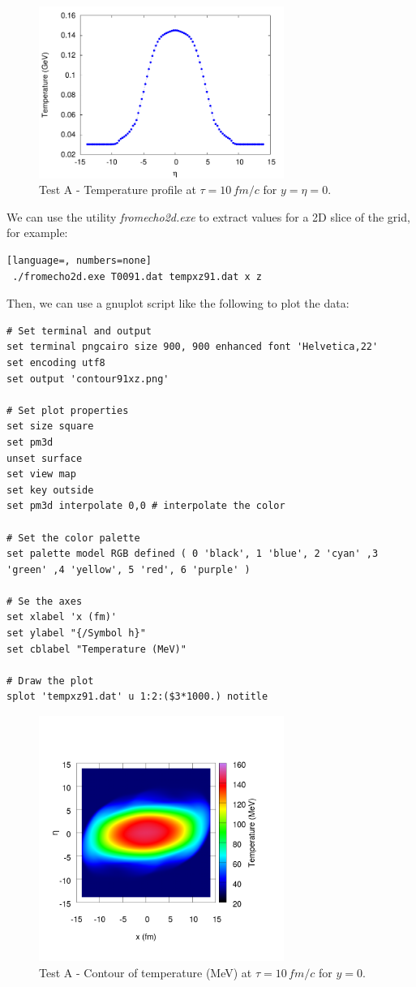 \begin{figure}[!h]
 \begin{center}
  \includegraphics[width=8cm]{images/temperature.pdf}
   \caption{Test A - Temperature profile at $\tau=10\,fm/c$ for $y=\eta=0$.}
    \label{plot4}
 \end{center}
\end{figure}
We can use the utility \emph{fromecho2d.exe} to extract values for a 2D slice of the grid, for example:
\begin{lstlisting}[language=, numbers=none] 
 ./fromecho2d.exe T0091.dat tempxz91.dat x z
\end{lstlisting}
Then, we can use a gnuplot script like the following to plot the data:
\begin{lstlisting}[numbers=none, language=Gnuplot]
# Set terminal and output
set terminal pngcairo size 900, 900 enhanced font 'Helvetica,22'
set encoding utf8
set output 'contour91xz.png'

# Set plot properties
set size square
set pm3d
unset surface 
set view map
set key outside
set pm3d interpolate 0,0 # interpolate the color

# Set the color palette
set palette model RGB defined ( 0 'black', 1 'blue', 2 'cyan' ,3 'green' ,4 'yellow', 5 'red', 6 'purple' )

# Se the axes
set xlabel 'x (fm)'
set ylabel "{/Symbol h}"
set cblabel "Temperature (MeV)"

# Draw the plot
splot 'tempxz91.dat' u 1:2:($3*1000.) notitle
\end{lstlisting}
\begin{figure}[!h]
 \begin{center}
  \includegraphics[width=8cm]{images/contour91xz.png}
   \caption{Test A - Contour of temperature (MeV) at $\tau=10\,fm/c$ for $y=0$.}
    \label{plot5}
 \end{center}
\end{figure}
